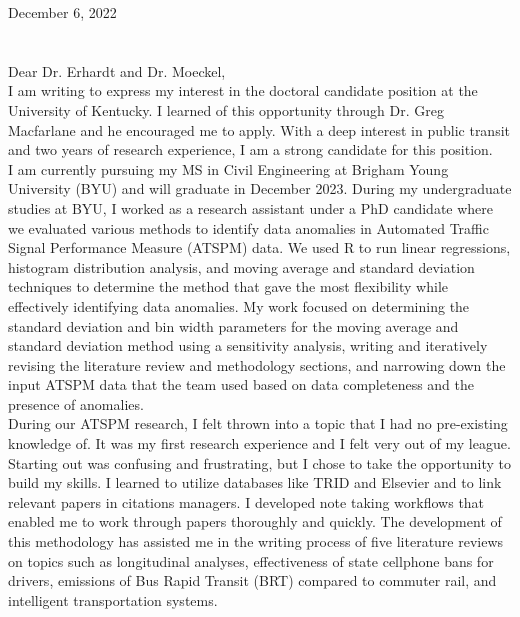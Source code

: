 \documentclass{resume} %
\begin{document}
December 6, 2022\\\\\\

Dear Dr. Erhardt and Dr. Moeckel,\\

I am writing to express my interest in the doctoral candidate position at the University of Kentucky. I learned of this opportunity through Dr. Greg Macfarlane and he encouraged me to apply. With a deep interest in public transit and two years of research experience, I am a strong candidate for this position.\\

I am currently pursuing my MS in Civil Engineering at Brigham Young University (BYU) and will graduate in December 2023. During my undergraduate studies at BYU, I worked as a research assistant under a PhD candidate where we evaluated various methods to identify data anomalies in Automated Traffic Signal Performance Measure (ATSPM) data. We used R to run linear regressions, histogram distribution analysis, and moving average and standard deviation techniques to determine the method that gave the most flexibility while effectively identifying data anomalies. My work focused on determining the standard deviation and bin width parameters for the moving average and standard deviation method using a sensitivity analysis, writing and iteratively revising the literature review and methodology sections, and narrowing down the input ATSPM data that the team used based on data completeness and the presence of anomalies. \\

During our ATSPM research, I felt thrown into a topic that I had no pre-existing knowledge of. It was my first research experience and I felt very out of my league. Starting out was confusing and frustrating, but I chose to take the opportunity to build my skills. I learned to utilize databases like TRID and Elsevier and to link relevant papers in citations managers. I developed note taking workflows that enabled me to work through papers thoroughly and quickly. The development of this methodology has assisted me in the writing process of five literature reviews on topics such as longitudinal analyses, effectiveness of state cellphone bans for drivers, emissions of Bus Rapid Transit (BRT) compared to commuter rail, and intelligent transportation systems. \\
\end{document}
